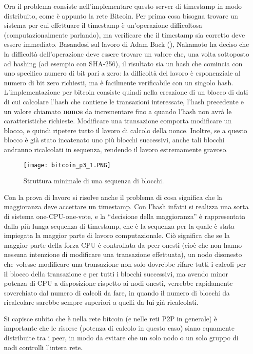 Ora il problema consiste nell'implementare questo server di timestamp in modo distribuito, come è appunto la rete Bitcoin. Per prima cosa bisogna trovare un sistema per cui effettuare il timestamp è un'operazione difficoltosa (computazionalmente parlando), ma verificare che il timestamp sia corretto deve essere immediato. Basandosi sul lavoro di Adam Back (\cite{hashcash}), Nakamoto ha deciso che la difficoltà dell'operazione deve essere trovare un valore che, una volta sottoposto ad hashing (ad esempio con SHA-256), il risultato sia un hash che comincia con uno specifico numero di bit pari a zero: la difficoltà del lavoro è esponenziale al numero di bit zero richiesti, ma è facilmente verificabile con un singolo hash. L'implementazione per bitcoin consiste quindi nella creazione di un blocco di dati di cui calcolare l'hash che contiene le transazioni interessate, l'hash precedente e un valore chiamato \textbf{nonce} da incrementare fino a quando l'hash non avrà le caratteristiche richieste. Modificare una transazione comporta modificare un blocco, e quindi ripetere tutto il lavoro di calcolo della nonce. Inoltre, se a questo blocco è già stato incatenato uno più blocchi successivi, anche tali blocchi andranno ricalcolati in sequenza, rendendo il lavoro estremamente gravoso.

\begin{figure}[htbp]
\centering
\texttt{[image: bitcoin\_p3\_1.PNG]}
\caption{Struttura minimale di una sequenza di blocchi.\label{bitcoin_p3_1}}
\end{figure}

Con la prova di lavoro si risolve anche il problema di cosa significa che la maggioranza deve accettare un timestamp. Con l'hash infatti si realizza una sorta di sistema one-CPU-one-vote, e la ``decisione della maggioranza'' è rappresentata dalla più lunga sequenza di timestamp, che è la sequenza per la quale è stata impiegata la maggior parte di lavoro computazionale. Ciò significa che se la maggior parte della forza-CPU è controllata da peer onesti (cioè che non hanno nessuna intenzione di modificare una transazione effettuata), un nodo disonesto che volesse modificare una transazione non solo dovrebbe rifare tutti i calcoli per il blocco della transazione e per tutti i blocchi successivi, ma avendo minor potenza di CPU a disposizione rispetto ai nodi onesti, verrebbe rapidamente soverchiato dal numero di calcoli da fare, in quando il numero di blocchi da ricalcolare sarebbe sempre superiori a quelli da lui già ricalcolati.

Si capisce subito che è nella rete bitcoin (e nelle reti P2P in generale) è importante che le risorse (potenza di calcolo in questo caso) siano equamente distribuite tra i peer, in modo da evitare che un solo nodo o un solo gruppo di nodi controlli l'intera rete.


